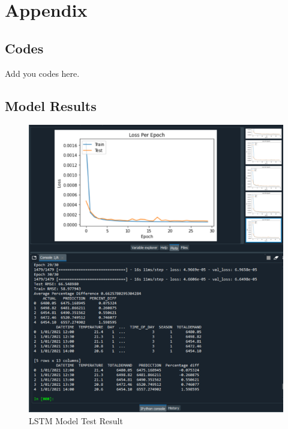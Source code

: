 \documentclass[mstat,12pt]{unswthesis}
\begin{document}



\hypertarget{appendix}{%
\chapter*{Appendix}\label{appendix}}

\hypertarget{codes}{%
\section*{\texorpdfstring{\textbf{Codes}}{Codes}}\label{codes}}

Add you codes here.

\hypertarget{model-results}{%
\section*{\texorpdfstring{\textbf{Model
Results}}{Model Results}}\label{model-results}}

\begin{figure}[H]
\includegraphics{snapshots1/LSTM Test Result 1.png}
\caption{LSTM Model Test Result}\label{ModelResult}
\end{figure}
\end{document}
